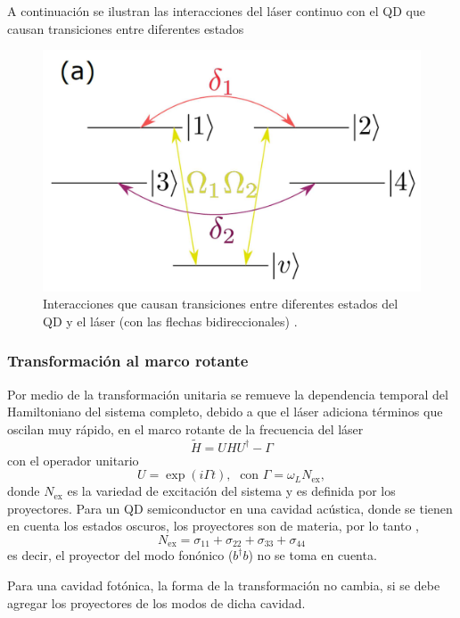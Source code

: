 \documentclass[../main.tex]{subfiles}
\begin{document}
A continuación se ilustran las interacciones del láser continuo con el QD que causan transiciones entre diferentes estados
\begin{figure}[th]
	\centering
	\includegraphics[width=0.35\linewidth]{img/pumpLaser}
	\caption{Interacciones que causan transiciones entre diferentes estados del QD y el láser (con las flechas bidireccionales) \parencite{Vargas2022}.}
	\label{fig:pumplaser}
\end{figure}

\subsubsection{Transformación al marco rotante}
Por medio de la transformación unitaria se remueve la dependencia temporal del Hamiltoniano del sistema completo, debido a que el láser adiciona términos que oscilan muy rápido, en el marco rotante de la frecuencia del láser 
\begin{equation}
	\tilde{H} = UHU^\dagger - \Gamma
\end{equation}
con el operador unitario
\begin{equation}
	U = \exp(i \Gamma t),\; \text{ con } \Gamma = \omega_L N_\text{ex},
\end{equation}
donde $N_\text{ex}$ es la variedad de excitación del sistema y es definida por los proyectores. Para un QD semiconductor en una cavidad acústica, donde se tienen en cuenta los estados oscuros, los proyectores son de materia, por lo tanto \parencite{Vargas2022},
\begin{equation}
	N_\text{ex} = \sigma_{11} + \sigma_{22} + \sigma_{33} + \sigma_{44}
\end{equation}
es decir, el proyector del modo fonónico ($b^\dagger b$) no se toma en cuenta.

Para una cavidad fotónica, la forma de la transformación no cambia, si se debe agregar los proyectores de los modos de dicha cavidad.
\end{document}
